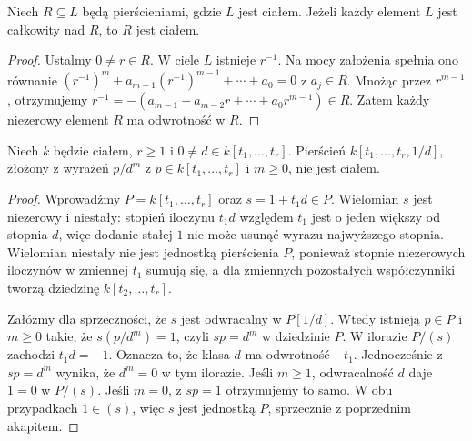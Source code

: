 \begin{lemat}
\label{lem:field-integral}
Niech $R\subseteq L$ będą pierścieniami, gdzie $L$ jest ciałem.
Jeżeli każdy element $L$ jest całkowity nad $R$, to $R$ jest ciałem.
\end{lemat}
\begin{proof}
Ustalmy $0\ne r\in R$. W ciele $L$ istnieje $r^{-1}$.
Na mocy założenia spełnia ono równanie
$(r^{-1})^m+a_{m-1}(r^{-1})^{m-1}+\cdots+a_0=0$
z $a_j\in R$. Mnożąc przez $r^{m-1}$, otrzymujemy
$ r^{-1}=-(a_{m-1}+a_{m-2}r+\cdots+a_0r^{m-1})\in R$.
Zatem każdy niezerowy element $R$ ma odwrotność w $R$.
\end{proof}

\begin{lemat}
\label{lem:localization-not-field}
Niech $k$ będzie ciałem, $r\ge1$ i
$0\ne d\in k[t_1,\dots,t_r]$.
Pierścień $k[t_1,\dots,t_r,1/d]$, złożony z wyrażeń
$p/d^m$ z $p\in k[t_1,\dots,t_r]$ i $m\ge0$,
nie jest ciałem.
\end{lemat}
\begin{proof}
Wprowadźmy $P=k[t_1,\dots,t_r]$ oraz $s=1+t_1d\in P$.
Wielomian $s$ jest niezerowy i niestały: stopień iloczynu
$t_1d$ względem $t_1$ jest o jeden większy od stopnia $d$,
więc dodanie stałej $1$ nie może usunąć wyrazu najwyższego stopnia.
Wielomian niestały nie jest jednostką pierścienia $P$,
ponieważ stopnie niezerowych iloczynów w zmiennej $t_1$
sumują się, a dla zmiennych pozostałych współczynniki tworzą
dziedzinę $k[t_2,\dots,t_r]$.

Załóżmy dla sprzeczności, że $s$ jest odwracalny w
$P[1/d]$. Wtedy istnieją $p\in P$ i $m\ge0$ takie, że
$s(p/d^m)=1$, czyli $sp=d^m$ w dziedzinie $P$.
W ilorazie $P/(s)$ zachodzi $t_1d=-1$.
Oznacza to, że klasa $d$ ma odwrotność $-t_1$.
Jednocześnie z $sp=d^m$ wynika, że $d^m=0$ w tym ilorazie.
Jeśli $m\ge1$, odwracalność $d$ daje $1=0$ w $P/(s)$.
Jeśli $m=0$, z $sp=1$ otrzymujemy to samo.
W obu przypadkach $1\in(s)$, więc $s$ jest jednostką $P$,
sprzecznie z poprzednim akapitem.
\end{proof}

